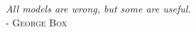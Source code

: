 \thispagestyle{empty}
\null{}
\begin{flushright}
\emph{All models are wrong, but some are useful.}\\
\textsc{- George Box}
\end {flushright}
\null